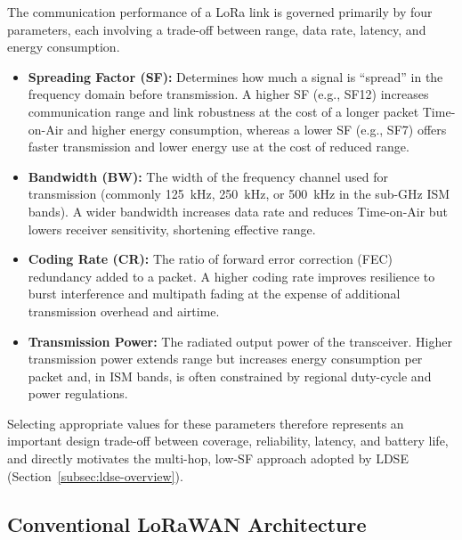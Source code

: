 The communication performance of a LoRa link is governed primarily by four
parameters, each involving a trade-off between range, data rate, latency, and
energy consumption.

\begin{itemize}
  \item \textbf{Spreading Factor (SF):} Determines how much a signal is
        ``spread'' in the frequency domain before transmission. A higher SF
        (e.g., SF12) increases communication range and link robustness at the
        cost of a longer packet Time-on-Air and higher energy consumption,
        whereas a lower SF (e.g., SF7) offers faster transmission and lower
        energy use at the cost of reduced range.

  \item \textbf{Bandwidth (BW):} The width of the frequency channel used for
        transmission (commonly 125~kHz, 250~kHz, or 500~kHz in the sub-GHz
        ISM bands). A wider bandwidth increases data rate and reduces
        Time-on-Air but lowers receiver sensitivity, shortening effective range.

  \item \textbf{Coding Rate (CR):} The ratio of forward error correction (FEC)
        redundancy added to a packet. A higher coding rate improves resilience
        to burst interference and multipath fading at the expense of additional
        transmission overhead and airtime.

  \item \textbf{Transmission Power:} The radiated output power of the
        transceiver. Higher transmission power extends range but increases
        energy consumption per packet and, in ISM bands, is often constrained
        by regional duty-cycle and power regulations.
\end{itemize}

Selecting appropriate values for these parameters therefore represents an
important design trade-off between coverage, reliability, latency, and battery
life, and directly motivates the multi-hop, low-SF approach adopted by LDSE
(Section~\ref{subsec:ldse-overview}).


\subsection{Conventional LoRaWAN Architecture}

